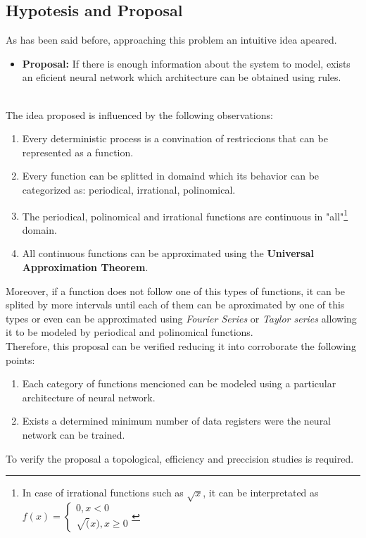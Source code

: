 \documentclass[a4paper, 11pt]{article}
\begin{document}
\subsection{Hypotesis and Proposal}
As has been said before, approaching this problem an intuitive idea apeared. \\
\hline
\begin{itemize}
    \item \textbf{Proposal:} If there is enough information about the system to model, exists an eficient neural network which architecture can be obtained using rules.
\end{itemize}
\hline \\ \vspace{0.5em}
The idea proposed is influenced by the following observations:
\begin{enumerate}
    \item Every deterministic process is a convination of restriccions that can be represented as a function.
    \item Every function can be splitted in domaind which its behavior can be categorized as: periodical, irrational, polinomical.
    \item The periodical, polinomical and irrational functions are continuous in "all"\footnote{In case of irrational functions such as $\sqrt{x}$, it can be interpretated as $f(x) = \left\{ \begin{matrix} 0, x < 0 \\ \sqrt(x), x \geq 0 \end{matrix} \right.$} domain.
    \item All continuous functions can be approximated using the \textbf{Universal Approximation Theorem}.
\end{enumerate}
Moreover, if a function does not follow one of this types of functions, it can be splited by more intervals until each of them can be aproximated by one of this types or even can be approximated using \textit{Fourier Series} or \textit{Taylor series} allowing it to be modeled by periodical and polinomical functions.\\
Therefore, this proposal can be verified reducing it into corroborate the following points:
\begin{enumerate}
    \item Each category of functions mencioned can be modeled using a particular architecture of neural network.
    \item Exists a determined minimum number of data registers were the neural network can be trained.  
\end{enumerate}
To verify the proposal a topological, efficiency and preccision studies is required.
\end{document}
